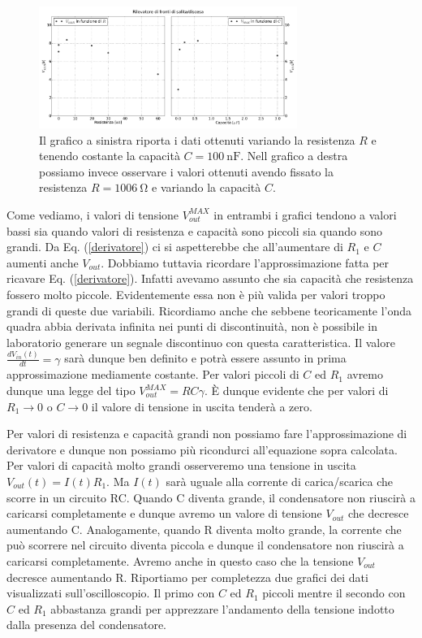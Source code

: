 \begin{figure}[h]
\center
	\includegraphics[width=0.75\textwidth]{dati.pdf}
	\caption{Il grafico a sinistra riporta i dati ottenuti variando la resistenza $R$ e tenendo costante la capacità $C = \SI{100}{\nano\farad}$. Nell grafico a destra possiamo invece osservare i valori ottenuti avendo fissato la resistenza $R=\SI{1006}{\ohm}$ e variando la capacità $C$.}
	\label{fig:dati}
\end{figure}


Come vediamo, i valori di tensione $V_{out}^{MAX}$ in entrambi i grafici tendono a valori bassi sia quando valori di resistenza e capacità sono piccoli sia quando sono grandi. Da Eq. (\ref{derivatore}) ci si aspetterebbe che all'aumentare di $R_1$ e $C$ aumenti anche $V_{out}$. Dobbiamo tuttavia ricordare l'approssimazione fatta per ricavare Eq. (\ref{derivatore}). Infatti avevamo assunto che sia capacità che resistenza fossero molto piccole. Evidentemente essa non è più valida per valori troppo grandi di queste due variabili. Ricordiamo anche che sebbene teoricamente l'onda quadra abbia derivata infinita nei punti di discontinuità, non è possibile in laboratorio generare un segnale discontinuo con questa caratteristica. Il valore $\frac{dV_{in}(t)}{dt}=\gamma$  sarà dunque ben definito e potrà essere assunto in prima approssimazione mediamente costante. Per valori piccoli di $C$ ed $R_1$ avremo dunque una legge del tipo $V_{out}^{MAX}= RC \gamma$. \`E dunque evidente che per valori di $R_1\rightarrow 0$ o $C\rightarrow 0$ il valore di tensione in uscita tenderà a zero.

Per valori di resistenza e capacità grandi non possiamo fare l'approssimazione di derivatore e dunque non possiamo più ricondurci all'equazione sopra calcolata. Per valori di capacità molto grandi osserveremo una tensione in uscita $V_{out}(t)=I(t) R_1$. Ma $I(t)$ sarà uguale alla corrente di carica/scarica che scorre in un circuito RC. Quando C diventa grande, il condensatore non riuscirà a caricarsi completamente e dunque avremo un valore di tensione $V_{out}$ che decresce aumentando C. Analogamente, quando R diventa molto grande, la corrente che può scorrere nel circuito diventa piccola e dunque il condensatore non riuscirà a caricarsi completamente. Avremo anche in questo caso che la tensione $V_{out}$ decresce aumentando R. Riportiamo per completezza due grafici dei dati visualizzati sull'oscilloscopio. Il primo con $C$ ed $R_1$ piccoli mentre il secondo con $C$ ed $R_1$ abbastanza grandi per apprezzare l'andamento della tensione indotto dalla presenza del condensatore.

